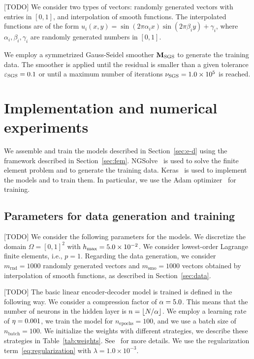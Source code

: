 [TODO]
We consider two types of vectors: randomly generated vectors with entries in \([0,1]\),
and interpolation of smooth functions.
The interpolated functions are of the form \(u_i(x,y) = \sin(2 \pi \alpha_i x) \sin(2 \pi \beta_i y) + \gamma_i\), where \(\alpha_i, \beta_i, \gamma_i\) are randomly generated numbers in \([0,1]\).

We employ a symmetrized Gauss-Seidel smoother \(\mathbf{M}_{\mathrm{SGS}}\) to generate the training data.
The smoother is applied until the residual is smaller than a given tolerance \(\varepsilon_{\mathrm{SGS}} = 0.1\) or until a maximum number of iterations \(\nu_{\mathrm{SGS}} = 1.0 \times 10^5\) is reached.

\section{Implementation and numerical experiments}

We assemble and train the models described in Section~\ref{sec:e-d} using the framework described in Section~\ref{sec:fem}.
NGSolve~\cite{schoberl2014c++} is used to solve the finite element problem and to generate the training data.
Keras~\cite{chollet2015keras} is used to implement the models and to train them.
In particular, we use the Adam optimizer~\cite{kingma2014adam} for training.

\subsection{Parameters for data generation and training}

[TODO]
We consider the following parameters for the models.
We discretize the domain \(\Omega = [0,1]^2\) with \(h_{\max} = 5.0 \times 10^{-2}\).
We consider lowest-order Lagrange finite elements, i.e., \(p = 1\).
Regarding the data generation, we consider \(m_\mathrm{rnd} = 1000\) randomly generated vectors and \(m_\mathrm{smo} = 1000\) vectors obtained by interpolation of smooth functions, as described in Section~\ref{sec:data}.

[TODO]
The basic linear encoder-decoder model is trained is defined in the following way.
We consider a compression factor of \(\alpha = 5.0\).
This means that the number of neurons in the hidden layer is \(n = \lfloor N/\alpha \rfloor\).
We employ a learning rate of \(\eta = 0.001\), we train the model for \(n_\mathrm{epochs} = 100\), and we use a batch size of \(n_\mathrm{batch} = 100\).
We initialize the weights with different strategies, we describe these strategies in Table~\ref{tab:weights}.
See~\cite{chollet2015keras, glorot2010understanding} for more details.
We use the regularization term~\eqref{eq:regularization} with \(\lambda = 1.0 \times 10^{-3}\).

